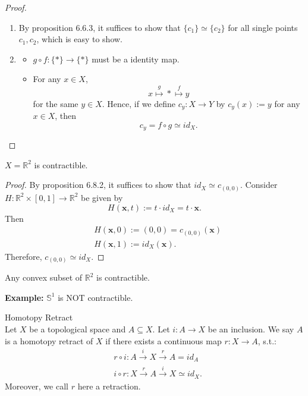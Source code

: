 \begin{proof}
    \begin{enumerate}
        \item By proposition 6.6.3, it suffices to show that $\{ c_1 \} \simeq \{ c_2 \}$ for all single points $c_1,c_2$, which is easy to show.
        \item \begin{itemize}
            \item $g \circ f: \{ *\} \rightarrow \{*\}$ must be a identity map.
            \item For any $x \in X$, 
            $$x \overset{g}{\longmapsto} * \overset{f}{\longmapsto} y$$
            for the same $y \in X$. Hence, if we define $c_y : X \rightarrow Y$ by $c_y (x) := y$ for any $x \in X$, then
            $$c_y = f \circ g \simeq id_X.$$
        \end{itemize}
    \end{enumerate}
\end{proof}

\begin{proposition}
    $X = \mathbb{R}^2$ is contractible.
\end{proposition}

\begin{proof}
    By proposition 6.8.2, it suffices to show that $id_X \simeq c_{(0,0)}$. Consider $H : \mathbb{R}^2 \times [0,1] \rightarrow \mathbb{R}^2$ be given by
    $$H ( \mathbf{x}, t) := t\cdot id_X = t \cdot \mathbf{x}.$$
    Then
    \begin{align*}
        &H(\mathbf{x},0) := (0,0) = c_{(0,0)} (\mathbf{x})\\
        &H(\mathbf{x},1) := id_X (\mathbf{x}).
    \end{align*}
    Therefore, $c_{(0,0)} \simeq id_X$.
\end{proof}

\begin{corollary}
    Any convex subset of $\mathbb{R}^2$ is contractible.
\end{corollary}

\noindent\textbf{Example:} $\mathbb{S}^1$ is NOT contractible.

\begin{definition}{Homotopy Retract}\\
Let $X$ be a topological space and $A \subseteq X$. Let $i : A \rightarrow X$ be an inclusion. We say $A$ is a homotopy retract of $X$ if there exists a continuous map $r : X \rightarrow A$, s.t.:
\begin{align*}
    &r \circ i : A \overset{i}{\rightarrow} X \overset{r}{\rightarrow} A = id_A\\
    &i \circ r : X \overset{r}{\rightarrow} A \overset{i}{\rightarrow} X \simeq id_X.
\end{align*}
Moreover, we call $r$ here a retraction.
\end{definition}

